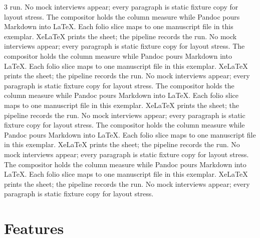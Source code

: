 \documentclass[
]{article}
\begin{document}
\begin{multicols}{3}
run. No mock interviews appear; every paragraph is static fixture copy
for layout stress. The compositor holds the column measure while Pandoc
pours Markdown into LaTeX. Each folio slice maps to one manuscript file
in this exemplar. XeLaTeX prints the sheet; the pipeline records the
run. No mock interviews appear; every paragraph is static fixture copy
for layout stress. The compositor holds the column measure while Pandoc
pours Markdown into LaTeX. Each folio slice maps to one manuscript file
in this exemplar. XeLaTeX prints the sheet; the pipeline records the
run. No mock interviews appear; every paragraph is static fixture copy
for layout stress. The compositor holds the column measure while Pandoc
pours Markdown into LaTeX. Each folio slice maps to one manuscript file
in this exemplar. XeLaTeX prints the sheet; the pipeline records the
run. No mock interviews appear; every paragraph is static fixture copy
for layout stress. The compositor holds the column measure while Pandoc
pours Markdown into LaTeX. Each folio slice maps to one manuscript file
in this exemplar. XeLaTeX prints the sheet; the pipeline records the
run. No mock interviews appear; every paragraph is static fixture copy
for layout stress. The compositor holds the column measure while Pandoc
pours Markdown into LaTeX. Each folio slice maps to one manuscript file
in this exemplar. XeLaTeX prints the sheet; the pipeline records the
run. No mock interviews appear; every paragraph is static fixture copy
for layout stress.

\end{multicols}

\newpage

\section{Features}\label{features}
\end{document}
